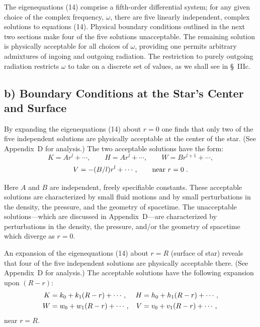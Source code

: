 \documentclass[12pt]{article}
\begin{document}
The eigenequations (14) comprise a fifth-order differential system; for any given
choice of the complex frequency, $\omega$, there are five linearly independent, complex solutions
to equations (14). Physical boundary conditions outlined in the next two sections
make four of the five solutions unacceptable. The remaining solution is physically acceptable for all choices of $\omega$, providing one permits arbitrary admixtures of ingoing and
outgoing radiation. The restriction to purely outgoing radiation restricts $\omega$ to take on a
discrete set of values, as we shall see in \S~IIIc.

\subsection*{b) Boundary Conditions at the Star's Center and Surface}

By expanding the eigenequations (14) about $r = 0$ one finds that only two of the
five independent solutions are physically acceptable at the center of the star. (See
Appendix~D for analysis.) The two acceptable solutions have the form:
\begin{equation}
  K = Ar^l + \cdots, \qquad
  H = Ar^l + \cdots, \qquad
  W = Br^{l+1} + \cdots,
\label{eq:15a}
\end{equation}
\begin{equation}
  V = -(B/l)r^l + \cdots, \qquad \text{near } r = 0\;.
\notag
\end{equation}

Here $A$ and $B$ are independent, freely specifiable constants. These acceptable solutions
are characterized by small fluid motions and by small perturbations in the density, the
pressure, and the geometry of spacetime. The unacceptable solutions---which are discussed in Appendix~D---are characterized by perturbations in the density, the pressure,
and/or the geometry of spacetime which diverge as $r = 0$.

An expansion of the eigenequations (14) about $r = R$ (surface of star) reveals that
four of the five independent solutions are physically acceptable there. (See Appendix~D
for analysis.) The acceptable solutions have the following expansion upon $(R - r)$:
\begin{align}
  K &= k_0 + k_1(R-r) + \cdots, &
  H &= h_0 + h_1(R-r) + \cdots, \notag \\
  W &= w_0 + w_1(R-r) + \cdots, &
  V &= v_0 + v_1(R-r) + \cdots,
\label{eq:15b}
\end{align}
near $r = R$.
\end{document}

